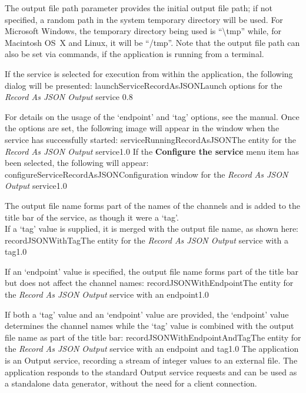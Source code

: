 The output file path parameter provides the initial output file path; if not specified, a
random path in the system temporary directory will be used.
For Microsoft Windows, the temporary directory being used is ``\textbackslash{}tmp''
while, for Macintosh OS~X and Linux, it will be ``/tmp''.
Note that the output file path can also be set via commands, if the application is
running from a terminal.\\

\insertStandardServiceCommands

If the service is selected for execution from within the \emph{\MMMU} application, the
following dialog will be presented:
%
{launchServiceRecordAsJSON}{Launch options for the \emph{Record As JSON Output} service}%
{0.8}

For details on the usage of the `endpoint' and `tag' options, see the \emph{\MMMU} manual.
Once the options are set, the following image will appear in the \emph{\MMMU} window when
the service has successfully started:
%
{serviceRunningRecordAsJSON}{The \emph{\MMMU} entity for the \emph{Record As JSON Output}
service}{1.0}
\condPage{}
If the \textbf{Configure the service} menu item has been selected, the following will
appear:
%
{configureServiceRecordAsJSON}{Configuration window for the \emph{Record As JSON Output}
service}{1.0}

The output file name forms part of the names of the channels and is added to the title bar
of the service, as though it were a `tag'.\\

If a `tag' value is supplied, it is merged with the output file name, as shown here:
%
{recordJSONWithTag}{The \emph{\MMMU} entity for the \emph{Record As JSON Output} service
with a tag}{1.0}

If an `endpoint' value is specified, the output file name forms part of the title bar but
does not affect the channel names:
%
{recordJSONWithEndpoint}{The \emph{\MMMU} entity for the \emph{Record As JSON Output}
service with an endpoint}{1.0}

If both a `tag' value and an `endpoint' value are provided, the `endpoint' value
determines the channel names while the `tag' value is combined with the output file name
as part of the title bar:
%
{recordJSONWithEndpointAndTag}{The \emph{\MMMU} entity for the \emph{Record As JSON
Output} service with an endpoint and tag}{1.0}
\condPage
{}
The  application is an Output
service, recording a stream of integer values to an external file.
The application responds to the standard Output service requests and can be used as a
standalone data generator, without the need for a client connection.\\

